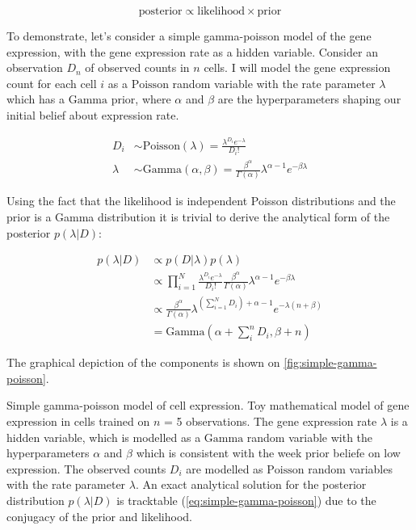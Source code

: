 \begin{equation}
\text{posterior} \propto \text{likelihood} \times \text{prior}
\end{equation}

To demonstrate, let’s consider a simple gamma-poisson model of the gene expression, with the gene expression rate as a hidden variable. Consider an observation $D_n$  of observed counts in $n$ cells. I will model the gene expression count for each cell $i$ as a $\text{Poisson}$ random variable with the rate parameter $\lambda$ which has a $\text{Gamma}$ prior, where $\alpha$ and $\beta$ are the hyperparameters shaping our initial belief about expression rate.

\begin{align}
    D_i & \sim \text{Poisson}(\lambda) = \frac{\lambda^{D_i} e^{-\lambda}}{D_i!} \\
    \lambda & \sim \text{Gamma}(\alpha, \beta) = \frac{\beta^\alpha}{\Gamma(\alpha)} \lambda^{\alpha - 1} e^{-\beta \lambda}
\end{align}
    
Using the fact that the likelihood is independent Poisson distributions and the prior is a Gamma distribution it is trivial to derive the analytical form of the posterior $p(\lambda|D)$:

\begin{align}
        p(\lambda|D) & \propto p(D|\lambda) p(\lambda) \\
         & \propto \prod_{i=1}^N \frac{\lambda^{D_i} e^{-\lambda}}{D_i!} \frac{\beta^\alpha}{\Gamma(\alpha)} \lambda^{\alpha - 1} e^{-\beta \lambda} \\ 
        & \propto  \frac{\beta^\alpha}{\Gamma(\alpha)} \lambda^{\left(\sum_{i=1}^N D_i\right) + \alpha - 1} e^{-\lambda(n+\beta)} \\
         & = \text{Gamma}(\alpha + \sum_i^n D_i, \beta + n)
        \label{eq:simple-gamma-poisson}
\end{align}

The graphical depiction of the components is shown on \cref{fig:simple-gamma-poisson}.

    {Simple gamma-poisson model of cell expression.}
    {Toy mathematical model of gene expression in cells trained on $n$ = 5 observations. The gene expression rate $\lambda$ is a hidden variable, which is modelled as a $\text{Gamma}$ random variable with the hyperparameters $\alpha$ and $\beta$ which is consistent with the week prior beliefe on low expression. The observed counts $D_i$ are modelled as $\text{Poisson}$ random variables with the rate parameter $\lambda$. An exact analytical solution for the posterior distribution $p(\lambda|D)$ is tracktable (\cref{eq:simple-gamma-poisson}) due to the conjugacy of the prior and likelihood.}

